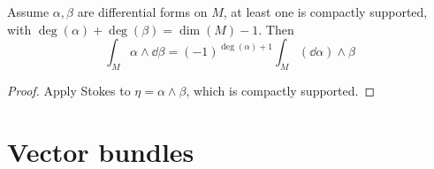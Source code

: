 \documentclass{article}
\begin{document}
\begin{corollary}
     Assume \(\alpha, \beta\) are differential forms on \(M\), at least one is compactly supported, with \(\deg(\alpha) + \deg(\beta) = \dim(M) - 1\). Then
    \[\int_M \alpha \wedge \dd \beta = (-1)^{\deg(\alpha) + 1}\int_M (\dd\alpha) \wedge \beta\]
\end{corollary}

\begin{proof}
    Apply Stokes to \(\eta = \alpha \wedge\beta\), which is compactly supported.
\end{proof}

\lec

\section{Vector bundles}
\end{document}
